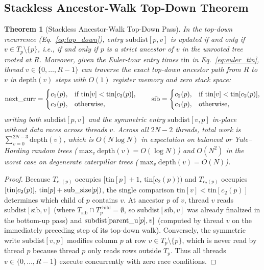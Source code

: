 \documentclass[11pt,a4paper]{article}
\makeatletter
\DeclareRobustCommand{\_}{\ifmmode\nfss@text{\textunderscore}\else\textunderscore\allowbreak\fi}
\newtheorem{theorem}{Theorem}[section]
\theoremstyle{definition}
\makeatother
\begin{document}
\subsection{Stackless Ancestor-Walk Top-Down Theorem}

\begin{theorem}[Stackless Ancestor-Walk Top-Down Pass]
\label{thm:ancestor_walk}
In the top-down recurrence (Eq.~\eqref{eq:top_down}), entry $\text{subdist}[p, v]$ is updated if and only if $v \in T_p \setminus \{p\}$, i.e., if and only if $p$ is a strict ancestor of $v$ in the unrooted tree rooted at $R$. Moreover, given the Euler-tour entry times $\text{tin}$ in Eq.~\eqref{eq:euler_tin}, thread $v \in \{0, \dots, R-1\}$ can traverse the exact top-down ancestor path from $R$ to $v$ in $\text{depth}(v)$ steps with $O(1)$ register memory and zero stack space:
\begin{equation}
\text{next\_curr} = \begin{cases} c_1(p), & \text{if } \text{tin}[v] < \text{tin}[c_2(p)], \\ c_2(p), & \text{otherwise}, \end{cases} \qquad
\text{sib} = \begin{cases} c_2(p), & \text{if } \text{tin}[v] < \text{tin}[c_2(p)], \\ c_1(p), & \text{otherwise}, \end{cases}
\end{equation}
writing both $\text{subdist}[p, v]$ and the symmetric entry $\text{subdist}[v, p]$ in-place without data races across threads $v$. Across all $2N-2$ threads, total work is $\sum_{v=0}^{2N-3} \text{depth}(v)$, which is $O(N \log N)$ in expectation on balanced or Yule--Harding random trees ($\max_v \text{depth}(v) = O(\log N)$) and $O(N^2)$ in the worst case on degenerate caterpillar trees ($\max_v \text{depth}(v) = O(N)$).
\end{theorem}
\begin{proof}
Because $T_{c_1(p)}$ occupies $[\text{tin}[p]+1, \, \text{tin}[c_2(p)))$ and $T_{c_2(p)}$ occupies $[\text{tin}[c_2(p)], \, \text{tin}[p]+\text{sub\_size}[p])$, the single comparison $\text{tin}[v] < \text{tin}[c_2(p)]$ determines which child of $p$ contains $v$. At ancestor $p$ of $v$, thread $v$ reads $\text{subdist}[\text{sib}, v]$ (where $T_{\text{sib}} \cap T_p^{\text{child}} = \emptyset$, so $\text{subdist}[\text{sib}, v]$ was already finalized in the bottom-up pass) and $\text{subdist}[\text{parent\_u}[p], v]$ (computed by thread $v$ on the immediately preceding step of its top-down walk). Conversely, the symmetric write $\text{subdist}[v, p]$ modifies column $p$ at row $v \in T_p \setminus \{p\}$, which is never read by thread $p$ because thread $p$ only reads rows outside $T_p$. Thus all threads $v \in \{0, \dots, R-1\}$ execute concurrently with zero race conditions.
\end{proof}
\end{document}
